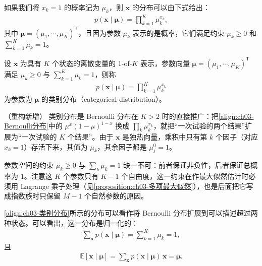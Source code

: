 \documentclass[../../main.tex]{subfiles}
\begin{document}
如果我们将 $x_k=1$ 的概率记为 $\mu_k$，则 $\boldsymbol{x}$ 的分布可以由下式给出：
\begin{align}
p(\boldsymbol{x}\mid\boldsymbol{\mu})=\prod_{k=1}^{K}\mu_k^{x_k},
\label{align:ch03-类别分布}
\end{align}
其中 $\boldsymbol{\mu}=(\mu_1,\cdots,\mu_K)^{\mathsf{T}}$，且因为参数 $\mu_k$ 表示的是概率，它们满足约束 $\mu_k\geqslant0$ 和 $\sum_{k=1}^{K}\mu_k=1$。

\begin{definition}[类别分布]\label{definition:ch03-类别分布}
设 $\boldsymbol{x}$ 为具有 $K$ 个状态的离散变量的 1-of-$K$ 表示，参数向量 $\boldsymbol{\mu}=(\mu_1,\cdots,\mu_K)^{\mathsf{T}}$ 满足 $\mu_k\geqslant0$ 与 $\sum_{k=1}^{K}\mu_k=1$，则称
\begin{align*}
p(\boldsymbol{x}\mid\boldsymbol{\mu})=\prod_{k=1}^{K}\mu_k^{x_k}
\end{align*}
为参数为 $\boldsymbol{\mu}$ 的类别分布（categorical distribution）。
\end{definition}

\begin{remark}（重构新增）
类别分布是 Bernoulli 分布在 $K>2$ 时的直接推广：把\eqref{align:ch03-Bernoulli分布}中的 $\mu^{x}(1-\mu)^{1-x}$ 换成 $\prod_k\mu_k^{x_k}$，就把“一次试验的两个结果”扩展为“一次试验的 $K$ 个结果”。由于 $\boldsymbol{x}$ 是独热向量，乘积中只有第 $k$ 个因子（对应 $x_k=1$）存活下来，其值为 $\mu_k$，其余因子都是 $\mu_j^{0}=1$。

参数空间的约束 $\mu_k\geqslant0$ 与 $\sum_k\mu_k=1$ 缺一不可：前者保证非负性，后者保证总概率为 $1$。注意这 $K$ 个参数只有 $K-1$ 个自由度，这一约束在作最大似然估计时必须用 Lagrange 乘子处理（见\cref{proposition:ch03-多项最大似然}），也是后面把它写成指数族时只保留 $M-1$ 个自然参数的原因。
\end{remark}

\cref{align:ch03-类别分布}所示的分布可以看作将 Bernoulli 分布扩展到可以描述超过两种状态。可以看出，这一分布是归一化的：
\begin{align}
\sum_{\boldsymbol{x}}p(\boldsymbol{x}\mid\boldsymbol{\mu})=\sum_{k=1}^{K}\mu_k=1,
\label{align:ch03-类别分布归一}
\end{align}
且
\begin{align}
\mathbb{E}[\boldsymbol{x}\mid\boldsymbol{\mu}]=\sum_{\boldsymbol{x}}p(\boldsymbol{x}\mid\boldsymbol{\mu})\,\boldsymbol{x}=\boldsymbol{\mu}.
\label{align:ch03-类别分布均值}
\end{align}
\end{document}
